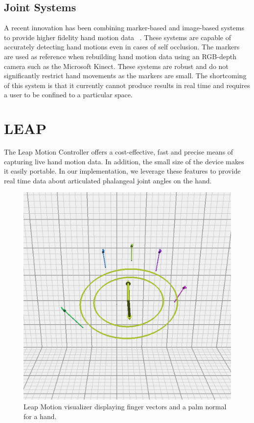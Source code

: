 \documentclass[review]{acmsiggraph}
\begin{document}
\subsection{Joint Systems}

A recent innovation has been combining marker-based
and image-based systems to provide higher fidelity hand
motion data ~\cite{ZCX12}. These systems are capable of accurately
detecting hand motions even in cases of self occlusion.
The markers are used as reference when rebuilding
hand motion data using an RGB-depth camera such as
the Microsoft Kinect. These systems are robust and do not
significantly restrict hand movements as the markers are
small. The shortcoming of this system is that it currently
cannot produce results in real time and requires a user to be
confined to a particular space.

\section{LEAP}



The Leap Motion Controller offers a cost-effective, fast
and precise means of capturing live hand motion data. In
addition, the small size of the device makes it easily portable.
In our implementation, we leverage these features to
provide real time data about articulated phalangeal joint
angles on the hand.


\begin{figure}
\centering
\includegraphics[scale=0.27]{leap-palm-and-fingers.png}
\vspace{-0.1cm}
\caption{Leap Motion visualizer displaying finger vectors and a palm normal for a hand. \label{HighLevel}}
\vspace{-0.5cm}
\end{figure}
\end{document}

